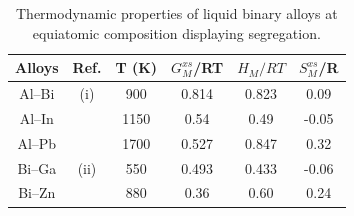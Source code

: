 \documentclass[12pt]{article}
\newcommand*{\1}{\hspace{1pt}}
\begin{document}
\begin{table}[t!]
\centering
\caption{Thermodynamic properties of liquid binary alloys at equiatomic composition displaying
segregation.}
 \begin{tabular}{|c c c c c c|} 
 \hline
 Alloys & Ref. & T (K) & $G ^ {xs} _ {M}$/RT & $H _M/RT$ & $S ^ {xs} _ {M}$/R \\ [0.5ex] 
 \hline\hline
 Al–Bi & (i) & 900 & 0.814 & 0.823 & 0.09 \\ 
 Al–In &     & 1150 & 0.54 & 0.49 & -0.05 \\
 Al–Pb &     & 1700 & 0.527 & 0.847 & 0.32 \\
 Bi–Ga & (ii) & 550 & 0.493 & 0.433 & -0.06 \\
 Bi–Zn &     & 880 & 0.36 & 0.60 & 0.24 \\ [1ex] 
 \hline
 \end{tabular}
\end{table}
\end{document}
